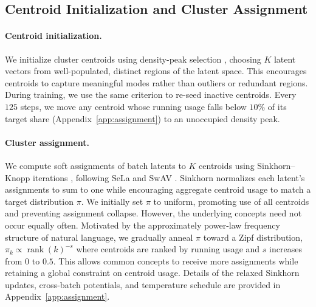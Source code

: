 \documentclass[11pt]{article}
\begin{document}



\subsection{Centroid Initialization and Cluster Assignment}
\label{sec:assign}

\paragraph{Centroid initialization.} We initialize cluster centroids using density-peak selection \citep{rodriguez2014peaks}, choosing $K$ latent vectors from well-populated, distinct regions of the latent space. This encourages centroids to capture meaningful modes rather than outliers or redundant regions. During training, we use the same criterion to re-seed inactive centroids. Every $125$ steps, we move any centroid whose running usage falls below $10\%$ of its target share (Appendix~\ref{app:assignment}) to an unoccupied density peak.

\paragraph{Cluster assignment.}We compute soft assignments of batch latents to \(K\) centroids using Sinkhorn--Knopp iterations \citep{cuturi2013sinkhorn}, following SeLa and SwAV \citep{asano2020sela,caron2020swav}. Sinkhorn normalizes each latent's assignments to sum to one while encouraging aggregate centroid usage to match a target distribution \(\pi\). We initially set \(\pi\) to uniform, promoting use of all centroids and preventing assignment collapse. However, the underlying concepts need not occur equally often. Motivated by the approximately power-law frequency structure of natural language, we gradually anneal $\pi$ toward a Zipf distribution,
$\pi_k \propto \operatorname{rank}(k)^{-s}$
where centroids are ranked by running usage and $s$ increases from $0$ to $0.5$. This allows common concepts to receive more assignments while retaining a global constraint on centroid usage. Details of the relaxed Sinkhorn updates, cross-batch
potentials, and temperature schedule are provided in
Appendix~\ref{app:assignment}.
\end{document}
